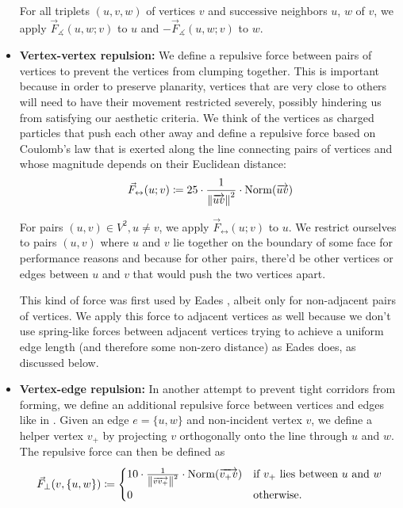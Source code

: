 \begin{itemize}
For all triplets $(u,v,w)$ of vertices $v$ and successive neighbors $u$, $w$ of $v$, we apply $\vec{F}_\measuredangle(u,w;v)$ to $u$ and $-\vec{F}_\measuredangle(u,w;v)$ to $w$.


\item \textbf{Vertex-vertex repulsion:} %
We define a repulsive force between pairs of vertices to prevent the vertices from clumping together.
This is important because in order to preserve planarity, vertices that are very close to others will need to have their movement restricted severely, possibly hindering us from satisfying our aesthetic criteria.
We think of the vertices as charged particles that push each other away and define a repulsive force based on Coulomb's law that is exerted along the line connecting pairs of vertices and whose magnitude depends on their Euclidean distance:
%
\begin{equation}
	\vec{F}_\leftrightarrow(u;v) \coloneqq
	25 \cdot \frac{1}{\left\lVert\overrightarrow{uv}\right\rVert^2}
	\cdot \operatorname{Norm}(\overrightarrow{uv})
\end{equation}

For pairs $(u, v) \in V^2, u \neq v$, we apply $\vec{F}_\leftrightarrow(u;v)$ to $u$.
We restrict ourselves to pairs $(u,v)$ where $u$ and $v$ lie together on the boundary of some face for performance reasons and because for other pairs, there'd be other vertices or edges between $u$ and $v$ that would push the two vertices apart.

This kind of force was first used by Eades \cite{eades84heuristic}, albeit only for non-adjacent pairs of vertices.
We apply this force to adjacent vertices as well because we don't use spring-like forces between adjacent vertices trying to achieve a uniform edge length (and therefore some non-zero distance) as Eades does, as discussed below.


\item \textbf{Vertex-edge repulsion:} %
In another attempt to prevent tight corridors from forming, we define an additional repulsive force between vertices and edges like in \cite{bertault1999force}.
Given an edge $e = \{u,w\}$ and non-incident vertex $v$, we define a helper vertex $v_+$ by projecting $v$ orthogonally onto the line through $u$ and $w$.
The repulsive force can then be defined as
%
\begin{equation}
	\vec{F}_\bot(v,\{u,w\}) \coloneqq \begin{cases}
	10 \cdot \frac{1}{\left\lVert\overrightarrow{vv_+}\right\rVert^2} \cdot \operatorname{Norm}(\overrightarrow{v_+v}) & \text{if $v_+$ lies between $u$ and $w$}\\
	0 & \text{otherwise.}
 	\end{cases}
\end{equation}


\end{itemize}

